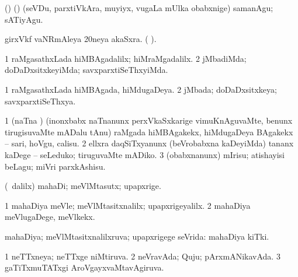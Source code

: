{{\bentry
{} 
\gl{\kirxvi}
\expl{}
\bmng
(\birx) (\AmA) (seVDu, parxtiVkAra, muyiyx, \mo vugaLa mUlka obabxnige) samanAgu; sATiyAgu. 
\emng
\eentry

\bentry
{} 
\gl{\nA}
\expl{}
\bmng
girxVkf vaNRmAleya 20neya akaSxra. ( ). 
\emng
\eentry

\bentry
{} 
\gl{\kirxvi}
\expl{}
\bmng
\bnum
\num{1} raMgasathxLada hiMBAgadalilx; hiMraMgadalilx. 
\num{2} jMbadiMda; doDaDxsitxkeyiMda; savxparxtiSeThxyiMda. 
\enum
\emng
\eentry

\bentry
{} 
\gl{\gu}
\expl{}
\bmng
\bnum
\num{1} raMgasathxLada hiMBAgada, hiMdugaDeya. 
\num{2} jMbada; doDaDxsitxkeya; savxparxtiSeThxya. 
\enum
\emng
\eentry

\bentry
{} 
\gl{\sakirx}
\expl{}
\bmng
\bnum
\num{1} (naTna \vi) (inonxbabx naTnanunx perxVkaSxkarige vimuKnAguvaMte, benunx tirugisuvaMte mADalu tAnu) raMgada hiMBAgakekx, hiMdugaDeya BAgakekx -- sari, hoVgu, calisu. 
\num{2} ellxra daqSiTxyanunx (beVrobabxna kaDeyiMda) tananx kaDege -- seLeduko; tiruguvaMte mADiko. 
\num{3} (obabxnanunx) mIrisu; atishayisi beLagu; miVri parxkAshisu. 
\enum
\emng
\eentry

\bentry
{} 
\gl{\gu}
\bmng
{} 
\emng
\eentry

\bentry
{} 
\gl{\nA}
\expl{}
\bmng
(\sA\ \Eva dalilx) mahaDi; meVlMtasutx; upapxrige. 
\emng
\eentry

\bentry
{} 
\gl{\kirxvi}
\expl{}
\bmng
\bnum
\num{1} mahaDiya meVle; meVlMtasitxnalilx; upapxrigeyalilx. 
\num{2} mahaDiya meVlugaDege, meVlkekx. 
\enum
\emng

\noindent 
\gl{\pagu}
\expl{}
\bmng
{} 
\emng
\eentry

\bentry
{} 
\gl{\gu}
\expl{}
\bmng
mahaDiya; meVlMtasitxnalilxruva; upapxrigege seVrida:  mahaDiya kiTki. 
\emng
\eentry

\bentry
{} 
\gl{\gu}
\expl{}
\bmng
\bnum
\num{1} neTTxneya; neTTxge niMtiruva. 
\num{2} neVravAda; Quju; pArxmANikavAda. 
\num{3} gaTiTxmuTATxgi AroVgayxvaMtavAgiruva. 
\enum
\emng
\eentry

}}
